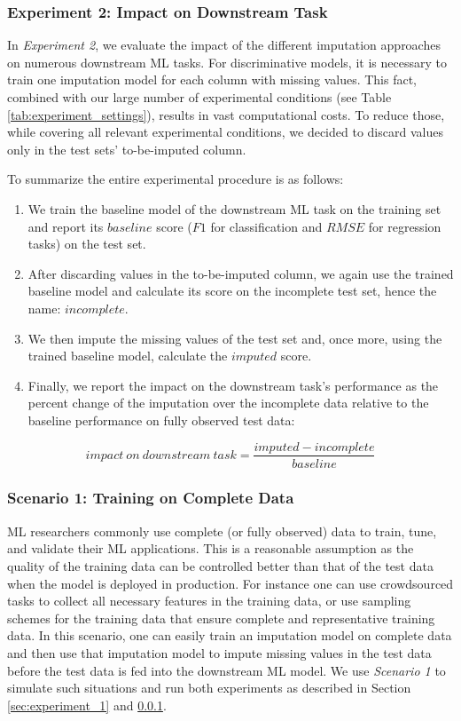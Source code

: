 \subsubsection{Experiment 2: Impact on Downstream Task}
\label{sec:experiment_2}
%
In \emph{Experiment 2}, we evaluate the impact of the different imputation approaches on numerous downstream ML tasks. For discriminative models, it is necessary to train one imputation model for each column with missing values. This fact, combined with our large number of experimental conditions (see Table \ref{tab:experiment_settings}), results in vast computational costs. To reduce those, while covering all relevant experimental conditions, we decided to discard values only in the test sets' to-be-imputed column.

To summarize the entire experimental procedure is as follows:

\begin{enumerate}
\item We train the baseline model of the downstream ML task on the training set and report its $baseline$ score ($F1$ for classification and $RMSE$ for regression tasks) on the test set.
\item After discarding values in the to-be-imputed column, we again use the trained baseline model and calculate its score on the incomplete test set, hence the name: $incomplete$.
\item We then impute the missing values of the test set and, once more, using the trained baseline model, calculate the $imputed$ score.
\item Finally, we report the impact on the downstream task's performance as the percent change of the imputation over the incomplete data relative to the baseline performance on fully observed test data:
\end{enumerate}
%
\begin{equation}
	impact\ on \ downstream\ task = \frac{imputed - incomplete}{baseline}
	\label{eq:impact}
\end{equation}
%



\subsubsection{Scenario 1: Training on Complete Data}
\label{sec:scenario_1}
%
ML researchers commonly use complete (or fully observed) data to train, tune, and validate their ML applications. This is a reasonable assumption as the quality of the training data can be controlled better than that of the test data when the model is deployed in production. For instance one can use crowdsourced tasks to collect all necessary features in the training data, or use sampling schemes for the training data that ensure complete and representative training data. In this scenario, one can easily train an imputation model on complete data and then use that imputation model to impute missing values in the test data before the test data is fed into the downstream ML model. We use \emph{Scenario 1} to simulate such situations and run both experiments as described in Section \ref{sec:experiment_1} and \ref{sec:experiment_2}.

